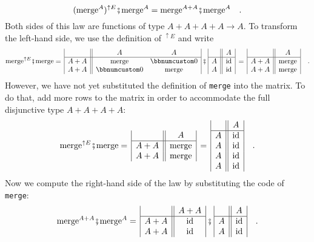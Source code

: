 ~\vspace{-0.3\baselineskip}
\[
(\text{merge}^{A})^{\uparrow E}\bef\text{merge}^{A}=\text{merge}^{A+A}\bef\text{merge}^{A}\quad.
\]
Both sides of this law are functions of type $A+A+A+A\rightarrow A$.
To transform the left-hand side, we use the definition of $^{\uparrow E}$
and write
\[
\text{merge}^{\uparrow E}\bef\text{merge}=\,\begin{array}{|c||cc|}
 & A & A\\
\hline A+A & \text{merge} & \bbnum 0\\
A+A & \bbnum 0 & \text{merge}
\end{array}\,\bef\,\begin{array}{|c||c|}
 & A\\
\hline A & \text{id}\\
A & \text{id}
\end{array}\,=\,\begin{array}{|c||c|}
 & A\\
\hline A+A & \text{merge}\\
A+A & \text{merge}
\end{array}\quad.
\]
However, we have not yet substituted the definition of \lstinline!merge!
into the matrix. To do that, add more rows to the matrix in order
to accommodate the full disjunctive type $A+A+A+A$:
\[
\text{merge}^{\uparrow E}\bef\text{merge}=\,\begin{array}{|c||c|}
 & A\\
\hline A+A & \text{merge}\\
A+A & \text{merge}
\end{array}\,=\,\begin{array}{|c||c|}
 & A\\
\hline A & \text{id}\\
A & \text{id}\\
A & \text{id}\\
A & \text{id}
\end{array}\quad.
\]
Now we compute the right-hand side of the law by substituting the
code of \lstinline!merge!:
\[
\text{merge}^{A+A}\bef\text{merge}^{A}=\,\begin{array}{|c||c|}
 & A+A\\
\hline A+A & \text{id}\\
A+A & \text{id}
\end{array}\,\bef\,\begin{array}{|c||c|}
 & A\\
\hline A & \text{id}\\
A & \text{id}
\end{array}\quad.
\]
